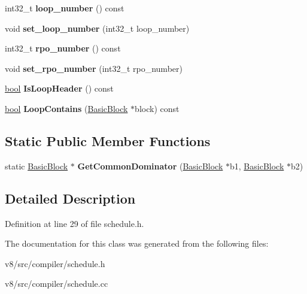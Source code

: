 \begin{DoxyCompactItemize}
\mbox{\label{classv8_1_1internal_1_1compiler_1_1BasicBlock_a734e794304aa7c633fbf74332059b1ce}} 
int32\+\_\+t {\bfseries loop\+\_\+number} () const
\item 
\mbox{\label{classv8_1_1internal_1_1compiler_1_1BasicBlock_a75b25f19c506fd7fc2560d5e46a0ad3c}} 
void {\bfseries set\+\_\+loop\+\_\+number} (int32\+\_\+t loop\+\_\+number)
\item 
\mbox{\label{classv8_1_1internal_1_1compiler_1_1BasicBlock_a151491c34ac00cd5a85d3b26f39fb44c}} 
int32\+\_\+t {\bfseries rpo\+\_\+number} () const
\item 
\mbox{\label{classv8_1_1internal_1_1compiler_1_1BasicBlock_ad2bfc68aaefb8822e33a417ad917f6d9}} 
void {\bfseries set\+\_\+rpo\+\_\+number} (int32\+\_\+t rpo\+\_\+number)
\item 
\mbox{\label{classv8_1_1internal_1_1compiler_1_1BasicBlock_aebd20273b715c4e966c748800c301804}} 
\mbox{\hyperlink{classbool}{bool}} {\bfseries Is\+Loop\+Header} () const
\item 
\mbox{\label{classv8_1_1internal_1_1compiler_1_1BasicBlock_a5645be1794e86c2cff02dacdedeb12f0}} 
\mbox{\hyperlink{classbool}{bool}} {\bfseries Loop\+Contains} (\mbox{\hyperlink{classv8_1_1internal_1_1compiler_1_1BasicBlock}{Basic\+Block}} $\ast$block) const
\end{DoxyCompactItemize}
\subsection*{Static Public Member Functions}
\begin{DoxyCompactItemize}
\item 
\mbox{\label{classv8_1_1internal_1_1compiler_1_1BasicBlock_aeab48d8c28877fcbf905f22222668007}} 
static \mbox{\hyperlink{classv8_1_1internal_1_1compiler_1_1BasicBlock}{Basic\+Block}} $\ast$ {\bfseries Get\+Common\+Dominator} (\mbox{\hyperlink{classv8_1_1internal_1_1compiler_1_1BasicBlock}{Basic\+Block}} $\ast$b1, \mbox{\hyperlink{classv8_1_1internal_1_1compiler_1_1BasicBlock}{Basic\+Block}} $\ast$b2)
\end{DoxyCompactItemize}


\subsection{Detailed Description}


Definition at line 29 of file schedule.\+h.



The documentation for this class was generated from the following files\+:\begin{DoxyCompactItemize}
\item 
v8/src/compiler/schedule.\+h\item 
v8/src/compiler/schedule.\+cc\end{DoxyCompactItemize}
